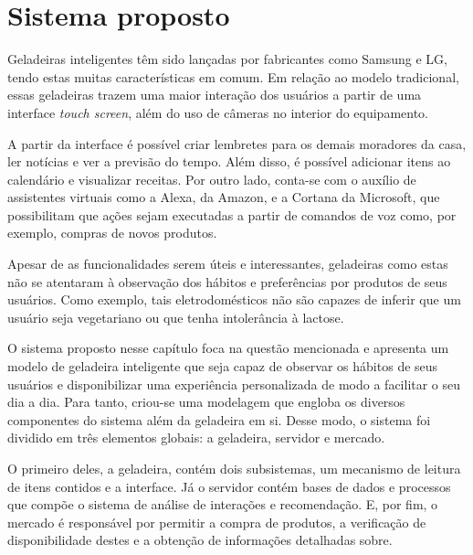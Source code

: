 \chapter{Sistema proposto}
\label{cap:sistema_proposto}



Geladeiras inteligentes têm sido lançadas por fabricantes como Samsung e LG, tendo estas muitas características em comum. Em relação ao modelo tradicional, essas geladeiras trazem uma maior interação dos usuários a partir de uma interface \textit{touch screen}, além do uso de câmeras no interior do equipamento.

A partir da interface é possível criar lembretes para os demais moradores da casa, ler notícias e ver a previsão do tempo. Além disso, é possível adicionar itens ao calendário e visualizar receitas. Por outro lado, conta-se com o auxílio de assistentes virtuais como a Alexa, da Amazon, e a Cortana da Microsoft, que possibilitam que ações sejam executadas a partir de comandos de voz como, por exemplo, compras de novos produtos. 

Apesar de as funcionalidades serem úteis e interessantes, geladeiras como estas não se atentaram à observação dos hábitos e preferências por produtos de seus usuários. Como exemplo, tais eletrodomésticos não são capazes de inferir que um usuário seja vegetariano ou que tenha intolerância à lactose.

    


O sistema proposto nesse capítulo foca na questão mencionada e apresenta um modelo de geladeira inteligente que seja capaz de observar os hábitos de seus usuários e disponibilizar uma experiência personalizada de modo a facilitar o seu dia a dia. Para tanto, criou-se uma modelagem que engloba os diversos componentes do sistema além da geladeira em si. Desse modo, o sistema foi dividido em três elementos globais: a geladeira, servidor e mercado.

O primeiro deles, a geladeira, contém dois subsistemas, um mecanismo de leitura de itens contidos e a interface. Já o servidor contém bases de dados e processos que compõe o sistema de análise de interações e recomendação. E, por fim, o mercado é responsável por permitir a compra de produtos, a verificação de disponibilidade destes e a obtenção de informações detalhadas sobre.
    

